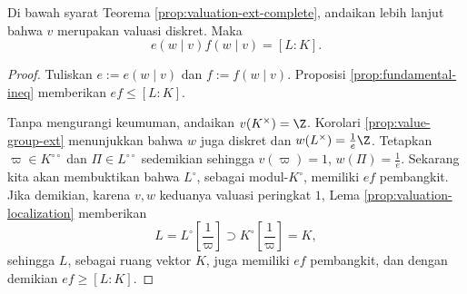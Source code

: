 \begin{theorem}\label{prop:fundamental-eq-complete}
	Di bawah syarat Teorema \ref{prop:valuation-ext-complete}, andaikan lebih lanjut bahwa $v$ merupakan valuasi diskret. Maka
	\[ e(w \mid v) f(w \mid v) = [L:K]. \]
\end{theorem}
\begin{proof}
	Tuliskan $e := e(w \mid v)$ dan $f := f(w \mid v)$. Proposisi \ref{prop:fundamental-ineq} memberikan $ef \leq [L:K]$.

	Tanpa mengurangi keumuman, andaikan $v(K^\times)=\Z$. Korolari \ref{prop:value-group-ext} menunjukkan bahwa $w$ juga diskret dan $w(L^\times) = \frac{1}{e}\Z$. Tetapkan $\varpi \in K^{\circ\circ}$ dan $\Pi \in L^{\circ\circ}$ sedemikian sehingga $v(\varpi) = 1$, $w(\Pi) = \frac{1}{e}$. Sekarang kita akan membuktikan bahwa $L^\circ$, sebagai modul-$K^\circ$, memiliki $ef$ pembangkit. Jika demikian, karena $v,w$ keduanya valuasi peringkat $1$, Lema \ref{prop:valuation-localization} memberikan
	\[ L = L^\circ\left[ \frac{1}{\varpi} \right] \supset K^\circ\left[ \frac{1}{\varpi} \right] = K, \]
	sehingga $L$, sebagai ruang vektor $K$, juga memiliki $ef$ pembangkit, dan dengan demikian $ef \geq [L:K]$.


\end{proof}
